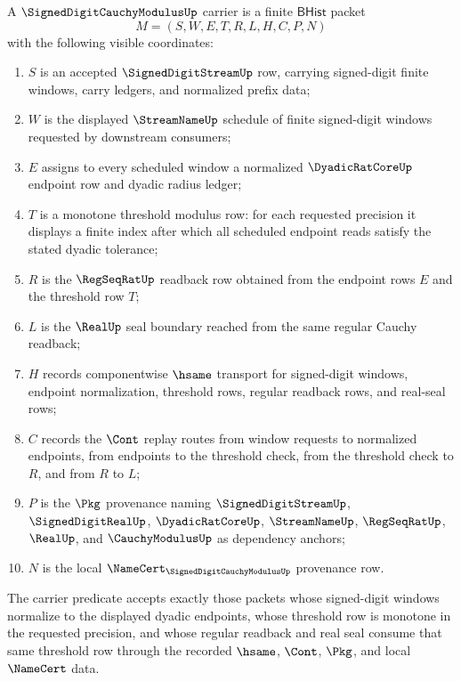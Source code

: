 \begin{definition}
\label{def:signed-digit-cauchy-modulus-carrier}
A $\SignedDigitCauchyModulusUp$ carrier is a finite $\mathsf{BHist}$ packet
$$
M=(S,W,E,T,R,L,H,C,P,N)
$$
with the following visible coordinates:
\begin{enumerate}
\item $S$ is an accepted $\SignedDigitStreamUp$ row, carrying signed-digit finite windows, carry ledgers, and normalized prefix data;
\item $W$ is the displayed $\StreamNameUp$ schedule of finite signed-digit windows requested by downstream consumers;
\item $E$ assigns to every scheduled window a normalized $\DyadicRatCoreUp$ endpoint row and dyadic radius ledger;
\item $T$ is a monotone threshold modulus row: for each requested precision it displays a finite index after which all scheduled endpoint reads satisfy the stated dyadic tolerance;
\item $R$ is the $\RegSeqRatUp$ readback row obtained from the endpoint rows $E$ and the threshold row $T$;
\item $L$ is the $\RealUp$ seal boundary reached from the same regular Cauchy readback;
\item $H$ records componentwise $\hsame$ transport for signed-digit windows, endpoint normalization, threshold rows, regular readback rows, and real-seal rows;
\item $C$ records the $\Cont$ replay routes from window requests to normalized endpoints, from endpoints to the threshold check, from the threshold check to $R$, and from $R$ to $L$;
\item $P$ is the $\Pkg$ provenance naming $\SignedDigitStreamUp$, $\SignedDigitRealUp$, $\DyadicRatCoreUp$, $\StreamNameUp$, $\RegSeqRatUp$, $\RealUp$, and $\CauchyModulusUp$ as dependency anchors;
\item $N$ is the local $\NameCert_{\SignedDigitCauchyModulusUp}$ provenance row.
\end{enumerate}
The carrier predicate accepts exactly those packets whose signed-digit windows normalize to the displayed dyadic endpoints, whose threshold row is monotone in the requested precision, and whose regular readback and real seal consume that same threshold row through the recorded $\hsame$, $\Cont$, $\Pkg$, and local $\NameCert$ data.
\end{definition}

